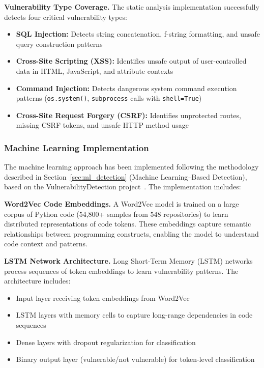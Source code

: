 \textbf{Vulnerability Type Coverage.}
The static analysis implementation successfully detects four critical vulnerability types:
\begin{itemize}
	\item \textbf{SQL Injection:} Detects string concatenation, f-string formatting, and unsafe query construction patterns
	\item \textbf{Cross-Site Scripting (XSS):} Identifies unsafe output of user-controlled data in HTML, JavaScript, and attribute contexts
	\item \textbf{Command Injection:} Detects dangerous system command execution patterns (\texttt{os.system()}, \texttt{subprocess} calls with \texttt{shell=True})
	\item \textbf{Cross-Site Request Forgery (CSRF):} Identifies unprotected routes, missing CSRF tokens, and unsafe HTTP method usage
\end{itemize}

\subsubsection{Machine Learning Implementation}
\label{sec:ml_impl}

The machine learning approach has been implemented following the methodology described in Section~\ref{sec:ml_detection} (Machine Learning--Based Detection), based on the VulnerabilityDetection project~\cite{VulnDetection}. The implementation includes:

\textbf{Word2Vec Code Embeddings.}
A Word2Vec model is trained on a large corpus of Python code (54,800+ samples from 548 repositories) to learn distributed representations of code tokens. These embeddings capture semantic relationships between programming constructs, enabling the model to understand code context and patterns.

\textbf{LSTM Network Architecture.}
Long Short-Term Memory (LSTM) networks process sequences of token embeddings to learn vulnerability patterns. The architecture includes:
\begin{itemize}
	\item Input layer receiving token embeddings from Word2Vec
	\item LSTM layers with memory cells to capture long-range dependencies in code sequences
	\item Dense layers with dropout regularization for classification
	\item Binary output layer (vulnerable/not vulnerable) for token-level classification
\end{itemize}

